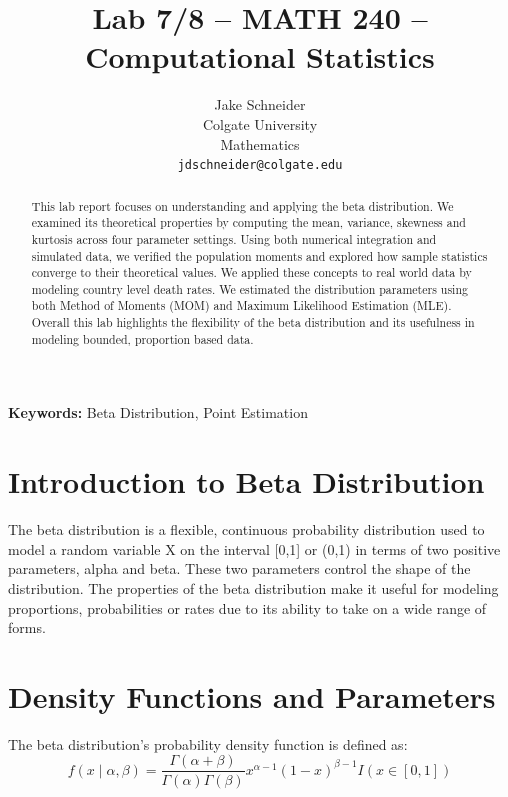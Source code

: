 \documentclass{article}\usepackage[]{graphicx}\usepackage[]{xcolor}
\begin{document}
\vspace{-1in}
\title{Lab 7/8 -- MATH 240 -- Computational Statistics}

\author{
  Jake Schneider \\
  Colgate University  \\
  Mathematics  \\
  {\tt jdschneider@colgate.edu}
}

\date{}

\maketitle

\begin{multicols}{2}
\begin{abstract}
This lab report focuses on understanding and applying the beta distribution. We examined its theoretical properties by computing the mean, variance, skewness and kurtosis across four parameter settings. Using both numerical integration and simulated data, we verified the population moments and explored how sample statistics converge to their theoretical values. We applied these concepts to real world data by modeling country level death rates. We estimated the distribution parameters using both Method of Moments (MOM) and Maximum Likelihood Estimation (MLE). Overall this lab highlights the flexibility of the beta distribution and its usefulness in modeling bounded, proportion based data. 
\end{abstract}

\noindent \textbf{Keywords:} Beta Distribution, Point Estimation

\section{Introduction to Beta Distribution}
The beta distribution is a flexible, continuous probability distribution used to model a random variable X on the interval [0,1] or (0,1) in terms of two positive parameters, alpha and beta. These two parameters control the shape of the distribution. The properties of the beta distribution make it useful for modeling proportions, probabilities or rates due to its ability to take on a wide range of forms.

\section{Density Functions and Parameters}
The beta distribution's probability density function is defined as:
\[
f(x \mid \alpha, \beta) = \frac{\Gamma(\alpha + \beta)}{\Gamma(\alpha)\Gamma(\beta)} x^{\alpha - 1}(1 - x)^{\beta - 1}I(x \in [0,1])
\]


\end{multicols}
\end{document}
